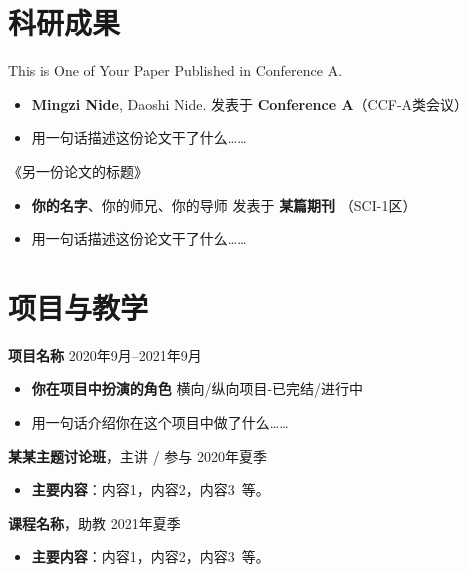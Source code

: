 \documentclass[11pt]{article}
\newlength{\iconwidth}
\begin{document}
    \begin{minipage}[t]{\textwidth}
    \section[科研成果]{\makebox[\iconwidth][c]{\color{primary_color}{\faAtom}}\quad 科研成果}

    This is One of Your Paper Published in Conference A.
    \begin{itemize}
        \item \textbf{Mingzi Nide}, Daoshi Nide. \hfill 发表于 \textbf{Conference A}（CCF-A类会议）
        \item 用一句话描述这份论文干了什么\dots\dots
    \end{itemize}

    \vspace{0.5em}
    《另一份论文的标题》
    \begin{itemize}
        \item  \textbf{你的名字}、你的师兄、你的导师 \hfill 发表于 \textbf{某篇期刊} （SCI-1区）
        \item 用一句话描述这份论文干了什么\dots\dots
    \end{itemize}
    
    \vspace{1.2em}
    \end{minipage}

    \begin{minipage}[t]{\textwidth}
    \section[项目与教学]{\makebox[\iconwidth][c]{\color{primary_color}{\faChalkboardTeacher}}\quad 项目与教学}
    
    {\large \textbf{项目名称}} \hfill 2020年9月--2021年9月
    \begin{itemize}
        \item \textbf{你在项目中扮演的角色} \hfill 横向/纵向项目-已完结/进行中
        \item 用一句话介绍你在这个项目中做了什么\dots\dots
    \end{itemize}

    \vspace{0.5em}
    {\large \textbf{某某主题讨论班}}，主讲 / 参与 \hfill 2020年夏季
    \begin{itemize}
        \item \textbf{主要内容}：内容1，内容2，内容3\ 等。
    \end{itemize}

    \vspace{0.5em}
    {\large \textbf{课程名称}}，助教 \hfill 2021年夏季
    \begin{itemize}
        \item \textbf{主要内容}：内容1，内容2，内容3\ 等。
    \end{itemize}
    
    \vspace{1.2em}
    \end{minipage}
    
\end{document}
